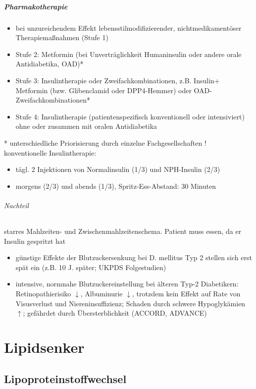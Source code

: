 \documentclass[10pt,a4paper]{report}
\begin{document}
\paragraph{Pharmakotherapie} %
\label{par:pharmakotherapie}
\begin{itemize}
	\item bei unzureichendem Effekt lebensstilmodifizierender, nichtmedikamentöser Therapiemaßnahmen (Stufe 1)
	\item Stufe 2: Metformin (bei Unverträglichkeit Humaninsulin oder andere orale Antidiabetika, OAD)*
	\item Stufe 3: Insulintherapie oder Zweifachkombinationen, z.B. Insulin+ Metformin (bzw. Glibenclamid oder DPP4-Hemmer) oder OAD-Zweifachkombinationen*  
	\item Stufe 4: Insulintherapie (patientenspezifisch konventionell oder intensiviert) ohne oder zusammen mit oralen Antidiabetika
\end{itemize}
* unterschiedliche Priorisierung durch einzelne Fachgesellschaften !\\
konventionelle Insulintherapie:
\begin{itemize}
	\item tägl. 2 Injektionen von Normalinsulin (1/3) und NPH-Insulin (2/3) 
	\item morgens (2/3) und abends (1/3), Spritz-Ess-Abstand: 30 Minuten
\end{itemize}
\subparagraph{Nachteil} %
\label{subp:nachteil}
starres Mahlzeiten- und Zwischenmahlzeitenschema. Patient muss essen, da er Insulin gespritzt hat
\begin{itemize}
	\item günstige Effekte der Blutzuckersenkung bei D. mellitus Typ 2 stellen sich erst spät ein (z.B. 10 J. später; UKPDS Folgestudien)
	\item intensive, normnahe Blutzuckereinstellung bei älteren Typ-2 Diabetikern: Retinopathierisiko $\downarrow$, Albuminurie $\downarrow$, trotzdem kein Effekt auf Rate von Visusverlust und Niereninsuffizienz; Schaden durch schwere Hypoglykämien $\uparrow$; gefährdet durch Übersterblichkeit (ACCORD, ADVANCE)
\end{itemize}
\chapter{Lipidsenker} %
\label{cha:lipidsenker}
\section{Lipoproteinstoffwechsel} %
\label{sec:lipoproteinstoffwechsel}
\end{document}
